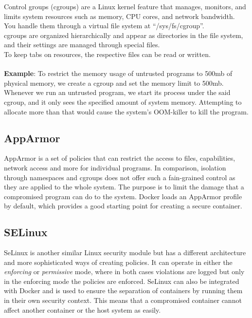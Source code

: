 \documentclass{article}
\begin{document}
Control groups (cgroups) are a Linux kernel feature that manages, monitors, 
and limits system resources such as memory, CPU cores, and network bandwidth. \\
You handle them through a virtual file system at ``/sys/fs/cgroup''. \\
cgroups are organized hierarchically and appear as directories in the file system, 
and their settings are managed through special files. \\
To keep tabs on resources, the respective files can be read or written.\\ \\
{\bf Example}: To restrict the memory usage of untrusted programs to 500mb of physical memory, 
we create a cgroup and set the memory limit to 500mb. \\
Whenever we run an untrusted program, we start its process under the said cgroup, 
and it only sees the specified amount of system memory. Attempting to allocate more than that would cause 
the system's OOM-killer to kill the program.

\subsection{AppArmor}

AppArmor is a set of policies that can restrict the access to files, 
capabilities, network access and more for individual programs.
In comparison, isolation through namespaces and cgroups does not offer such a fain-grained control 
as they are applied to the whole system.
The purpose is to limit the damage that a compromised program can do to the system.
Docker loads an AppArmor profile by default, which provides a good starting point for creating a secure container.

\subsection{SELinux}

SeLinux is another similar Linux security module but has a different architecture and more sophisticated 
ways of creating policies.
It can operate in either the \textit{enforcing} or \textit{permissive} mode, where in both cases violations 
are logged but only in the enforcing mode the policies are enforced.
SeLinux can also be integrated with Docker and is used to ensure the separation of containers by 
running them in their own security context.
This means that a compromised container cannot affect another container or the host system as easily.
\end{document}

